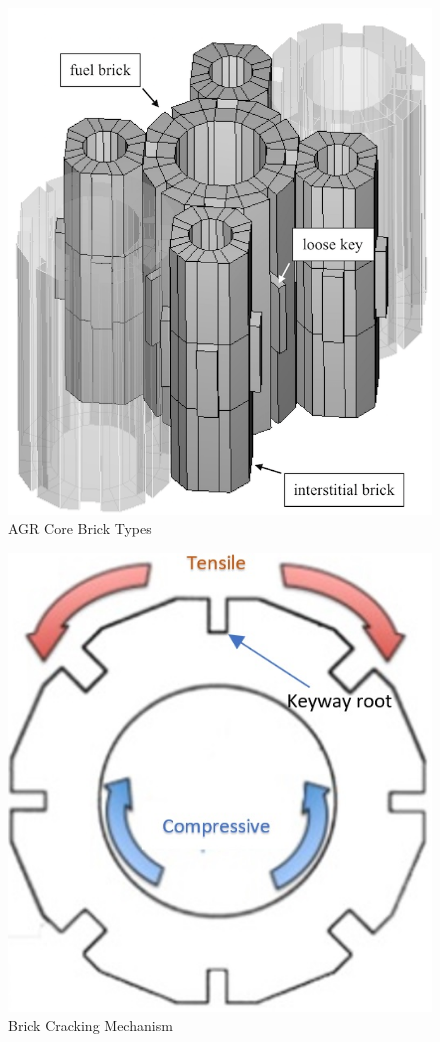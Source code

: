 \begin{figure}[ht!]
	\centering
	\includegraphics[scale=0.17]{Figures/brick_types_parmec}
	\caption{AGR Core Brick Types}
	\label{fig:bricks}
\end{figure}

\begin{figure}[ht!]
	\centering
	\includegraphics[scale=0.35]{Figures/cracking_mechanism}
	\caption{Brick Cracking Mechanism}
	\label{fig:cracking}
\end{figure}

